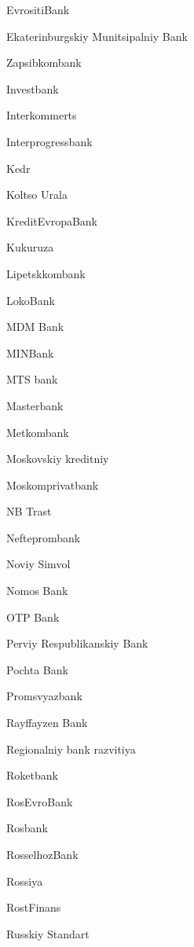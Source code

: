 \documentclass[a4paper,10pt,english]{sphinxmanual}
\begin{document}
\sphinxAtStartPar
EvrositiBank

\sphinxAtStartPar
Ekaterinburgskiy Munitsipalniy Bank

\sphinxAtStartPar
Zapsibkombank

\sphinxAtStartPar
Investbank

\sphinxAtStartPar
Interkommerts

\sphinxAtStartPar
Interprogressbank

\sphinxAtStartPar
Kedr

\sphinxAtStartPar
Koltso Urala

\sphinxAtStartPar
KreditEvropaBank

\sphinxAtStartPar
Kukuruza

\sphinxAtStartPar
Lipetskkombank

\sphinxAtStartPar
LokoBank

\sphinxAtStartPar
MDM Bank

\sphinxAtStartPar
MINBank

\sphinxAtStartPar
MTS bank

\sphinxAtStartPar
Masterbank

\sphinxAtStartPar
Metkombank

\sphinxAtStartPar
Moskovskiy kreditniy

\sphinxAtStartPar
Moskomprivatbank

\sphinxAtStartPar
NB Trast

\sphinxAtStartPar
Nefteprombank

\sphinxAtStartPar
Noviy Simvol

\sphinxAtStartPar
Nomos Bank

\sphinxAtStartPar
OTP Bank

\sphinxAtStartPar
Perviy Respublikanskiy Bank

\sphinxAtStartPar
Pochta Bank

\sphinxAtStartPar
Promsvyazbank

\sphinxAtStartPar
Rayffayzen Bank

\sphinxAtStartPar
Regionalniy bank razvitiya

\sphinxAtStartPar
Roketbank

\sphinxAtStartPar
RosEvroBank

\sphinxAtStartPar
Rosbank

\sphinxAtStartPar
RosselhozBank

\sphinxAtStartPar
Rossiya

\sphinxAtStartPar
RostFinans

\sphinxAtStartPar
Russkiy Standart
\end{document}
